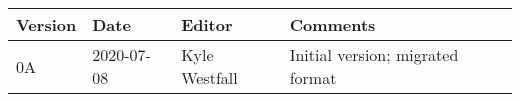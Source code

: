 \documentclass[11pt,a4paper,twoside,onecolumn,openany,final,oldfontcommands]{memoir}
\begin{document}
\begin{table}[hp]{%
\begin{tabular}{l | l | l |  p{22pc}} \toprule
{\bf Version} & {\bf Date} & {\bf Editor} & {\bf Comments} \\ \midrule
0A & 2020-07-08 & Kyle Westfall & Initial version; migrated format \\ \bottomrule
\end{tabular}}
\end{table}



\end{document}
